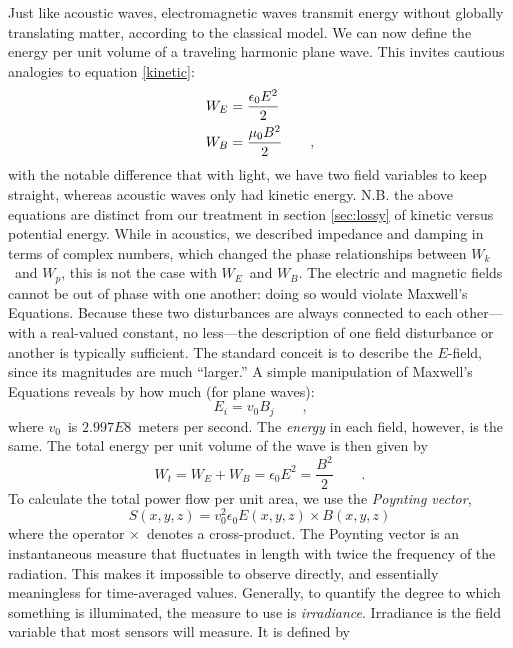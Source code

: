 \documentclass[a4paper,10pt]{report}
\numberwithin{equation}{section}
\begin{document}
{\begin{section}
Just like acoustic waves, electromagnetic waves transmit energy without globally translating matter, according to the classical model. We can now define the energy per unit volume of a traveling harmonic plane wave. This invites cautious analogies to equation \eqref{kinetic}:
\begin{align}
W_E &= \frac{\epsilon_0 E^2}{2}\notag\\
W_B &= \frac{\mu_0 B^2}{2}\qquad \text{,}
\end{align}
with the notable difference that with light, we have two field variables to keep straight, whereas acoustic waves only had kinetic energy. N.B. the above equations are distinct from our treatment in section \ref{sec:lossy} of kinetic versus potential energy. While in acoustics, we described impedance and damping in terms of complex numbers, which changed the phase relationships between $W_k$\  and $W_p$, this is not the case with $W_E$\  and $W_B$. The electric and magnetic fields cannot be out of phase with one another: doing so would violate Maxwell's Equations. \cite[p.~46]{Hecht1987} Because these two disturbances are always connected to each other---with a real-valued constant, no less---the description of one field disturbance or another is typically sufficient. The standard conceit is to describe the $E$-field, since its magnitudes are much ``larger.'' A simple manipulation of Maxwell's Equations reveals by how much  (for plane waves): \cite[p.~45]{Hecht1987}
\begin{equation}
E_i = v_0 B_j \qquad \text{,}
\end{equation}
where $v_0$\  is $2.997E8$\  meters per second. The \emph{energy} in each field, however, is the same. The total energy per unit volume of the wave is then given by \cite[p.~46]{Hecht1987} 
\begin{equation}
W_t = W_E + W_B = \epsilon_0 E^2 = \frac{B^2}{2} \qquad \text{.}
\end{equation}
To calculate the total power flow per unit area, we use the \emph{Poynting vector}, 
\begin{equation}
S(x,y,z) = v_0^2 \epsilon_0 E(x,y,z) \times B(x,y,z)
\end{equation}
where the operator $\times$\  denotes a cross-product. \cite[p.~46]{Hecht1987} The Poynting vector is an instantaneous measure that fluctuates in length with twice the frequency of the radiation. This makes it impossible to observe directly, and essentially meaningless for time-averaged values. Generally, to quantify the degree to which something is illuminated, the measure to use is \emph{irradiance}. Irradiance is the field variable that most sensors will measure. It is defined by

\end{section}}
\end{document}
